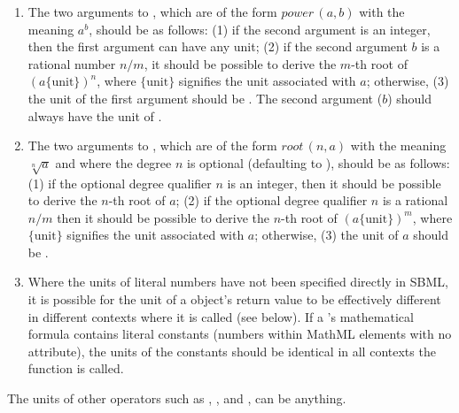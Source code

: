 \begin{enumerate}
\item The two arguments to , which are of the form
  $\textit{power}\,(a,b)$ with the meaning $a^b$, should be as
  follows: (1) if the second argument is an integer, then the
  first argument can have any unit; (2) if the second argument $b$
  is a rational number $n/m$, it should be possible to derive the
  $m$-th root of $(a \{\text{unit}\})^n$, where $\{\text{unit}\}$
  signifies the unit associated with $a$; otherwise, (3) the unit
  of the first argument should be .  The second
  argument ($b$) should always have the unit of .

\item The two arguments to , which are of the form
  $\textit{root}\,(n,a)$ with the meaning $\sqrt[n]{a}$ and where
  the degree $n$ is optional (defaulting to ), should be as
  follows: (1) if the optional degree qualifier $n$ is an integer,
  then it should be possible to derive the $n$-th root of $a$; (2)
  if the optional degree qualifier $n$ is a rational $n/m$ then it
  should be possible to derive the $n$-th root of $(a
  \{\text{unit}\})^m$, where $\{\text{unit}\}$ signifies the unit
  associated with $a$; otherwise, (3) the unit of $a$ should be
  .

\item Where the units of literal numbers have not been specified
  directly in SBML, it is possible for the unit of a
  \FunctionDefinition object's return value to be effectively
  different in different contexts where it is called (see below).
  If a \FunctionDefinition's mathematical formula contains literal
  constants (\ie numbers within MathML  elements with no
   attribute), the units of the constants should
  be identical in all contexts the function is called.

\end{enumerate}

The units of other operators such as , ,
and , can be anything.

